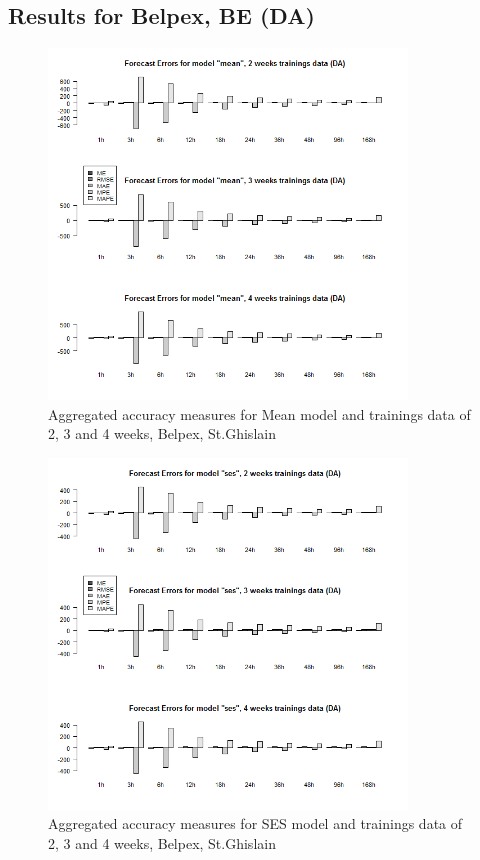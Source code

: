 \FloatBarrier
\subsection{Results for Belpex, BE (DA)} \label{ssec:app_graphs_belpex}


\begin{figure}[!ht]
	\centering
		\includegraphics[width=0.85\textwidth]{figures/appendix_forecast_results/da_sim_2_x_1w_1w_mean.png}
	\caption{Aggregated accuracy measures for Mean model and trainings data of 2, 3 and 4 weeks, Belpex, St.Ghislain}
	\label{fig:app_da_sim_2_x_1w_1w_mean}
\end{figure}



\begin{figure}[!ht]
	\centering
	\vspace*{-1.2in}
		\includegraphics[width=0.85\textwidth]{figures/appendix_forecast_results/da_sim_2_x_1w_1w_ses.png}
	\caption{Aggregated accuracy measures for SES model and trainings data of 2, 3 and 4 weeks, Belpex, St.Ghislain}
	\label{fig:app_da_sim_2_x_1w_1w_ses}
\end{figure}

